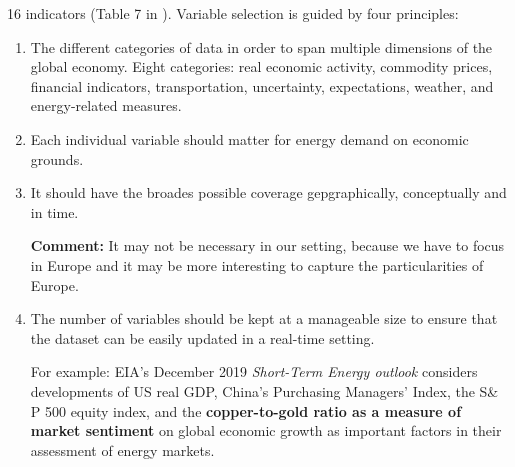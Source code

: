 16 indicators (Table 7 in \cite{baumeister2020energy}). Variable selection is guided by four principles:

\begin{enumerate}[wide, itemsep=0cm, topsep=0cm]
	\item The different categories of data in order to span multiple dimensions of the global economy. Eight categories: real economic activity, commodity prices, financial indicators, transportation, uncertainty, expectations, weather, and energy-related measures.
	\item Each individual variable should matter for energy demand on economic grounds.
	\item It should have the broades possible coverage gepgraphically, conceptually and in time.
	
	\noindent \textbf{Comment:} It may not be necessary in our setting, because we have to focus in Europe and it may be more interesting to capture the particularities of Europe.
	\item The number of variables should be kept at a manageable size to ensure that the dataset can be easily updated in a real-time setting.
	
	For example: EIA's December 2019 \emph{Short-Term Energy outlook} considers developments of US real GDP, China's Purchasing Managers' Index, the S\& P 500 equity index, and the \textbf{copper-to-gold ratio as a measure of market sentiment} on global economic growth as important factors in their assessment of energy markets.
\end{enumerate}